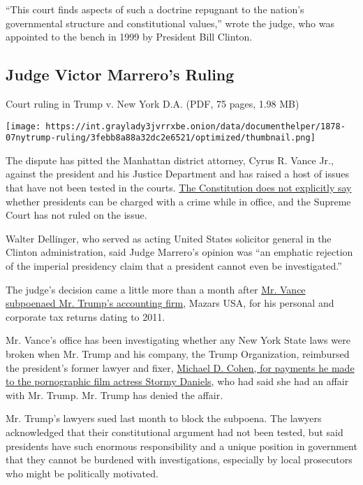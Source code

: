 ``This court finds aspects of such a doctrine repugnant to the nation's
governmental structure and constitutional values,'' wrote the judge, who
was appointed to the bench in 1999 by President Bill Clinton.

\hypertarget{judge-victor-marreros-ruling}{%
\subsection{Judge Victor Marrero's
Ruling}\label{judge-victor-marreros-ruling}}

Court ruling in Trump v. New York D.A. (PDF, 75 pages, 1.98 MB)

\texttt{[image: https://int.graylady3jvrrxbe.onion/data/documenthelper/1878-07nytrump-ruling/3febb8a88a32dc2e6521/optimized/thumbnail.png]}

The dispute has pitted the Manhattan district attorney, Cyrus R. Vance
Jr., against the president and his Justice Department and has raised a
host of issues that have not been tested in the courts.
\href{https://www.nytimes3xbfgragh.onion/2017/05/29/us/politics/a-constitutional-puzzle-can-the-president-be-indicted.html?module=inline}{The
Constitution does not explicitly say} whether presidents can be charged
with a crime while in office, and the Supreme Court has not ruled on the
issue.

Walter Dellinger, who served as acting United States solicitor general
in the Clinton administration, said Judge Marrero's opinion was ``an
emphatic rejection of the imperial presidency claim that a president
cannot even be investigated.''

The judge's decision came a little more than a month after
\href{https://www.nytimes3xbfgragh.onion/2019/09/16/nyregion/trump-tax-returns-cy-vance.html}{Mr.
Vance subpoenaed Mr. Trump's accounting firm}, Mazars USA, for his
personal and corporate tax returns dating to 2011.

Mr. Vance's office has been investigating whether any New York State
laws were broken when Mr. Trump and his company, the Trump Organization,
reimbursed the president's former lawyer and fixer,
\href{https://www.nytimes3xbfgragh.onion/2018/08/21/nyregion/michael-cohen-plea-deal-trump.html}{Michael
D. Cohen, for payments he made to the pornographic film actress Stormy
Daniels}, who had said she had an affair with Mr. Trump. Mr. Trump has
denied the affair.

Mr. Trump's lawyers sued last month to block the subpoena. The lawyers
acknowledged that their constitutional argument had not been tested, but
said presidents have such enormous responsibility and a unique position
in government that they cannot be burdened with investigations,
especially by local prosecutors who might be politically motivated.

